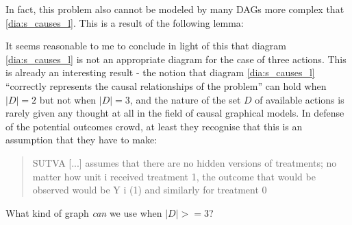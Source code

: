 In fact, this problem also cannot be modeled by many DAGs more complex that \ref{dia:s_causes_l}. This is a result of the following lemma:



It seems reasonable to me to conclude in light of this that diagram \ref{dia:s_causes_l} is not an appropriate diagram for the case of three actions. This is already an interesting result - the notion that diagram \ref{dia:s_causes_l} ``correctly represents the causal relationships of the problem'' can hold when $|D|=2$ but not when $|D|=3$, and the nature of the set $D$ of available actions is rarely given any thought at all in the field of causal graphical models. In defense of the potential outcomes crowd, at least they recognise that this is an assumption that they have to make: 

\begin{quote}
 SUTVA [...] assumes that there are no hidden versions of treatments; no matter how unit i received treatment 1, the outcome that would be observed would be Y i (1) and similarly for treatment 0 \citep{rubin_causal_2005}
\end{quote}


What kind of graph \emph{can} we use when $|D|>=3$?